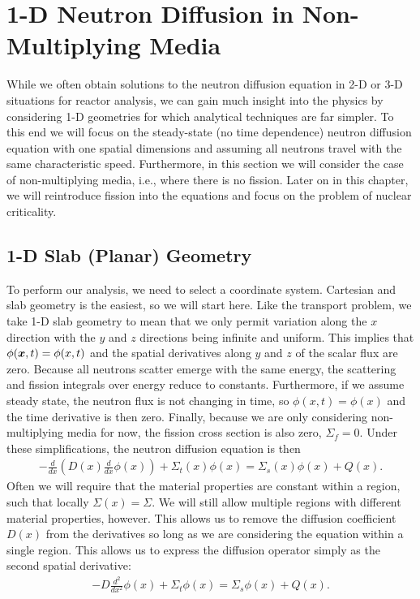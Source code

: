 \section{1-D Neutron Diffusion in Non-Multiplying Media}

While we often obtain solutions to the neutron diffusion equation in 2-D or 3-D situations for reactor analysis, we can gain much insight into the physics by considering 1-D geometries for which analytical techniques are far simpler. To this end we will focus on the steady-state (no time dependence) neutron diffusion equation with one spatial dimensions and assuming all neutrons travel with the same characteristic speed. Furthermore, in this section we will consider the case of non-multiplying media, i.e., where there is no fission. Later on in this chapter, we will reintroduce fission into the equations and focus on the problem of nuclear criticality.

\subsection{1-D Slab (Planar) Geometry}

To perform our analysis, we need to select a coordinate system. Cartesian and slab geometry is the easiest, so we will start here. Like the transport problem, we take 1-D slab geometry to mean that we only permit variation along the $x$ direction with the $y$ and $z$ directions being infinite and uniform. This implies that $\phi(\bm{x},t) = \phi(x,t)$ and the spatial derivatives along $y$ and $z$ of the scalar flux are zero. Because all neutrons scatter emerge with the same energy, the scattering and fission integrals over energy reduce to constants. Furthermore, if we assume steady state, the neutron flux is not changing in time, so $\phi(x,t) = \phi(x)$ and the time derivative is then zero. Finally, because we are only considering non-multiplying media for now, the fission cross section is also zero, $\Sigma_f = 0$. Under these simplifications, the neutron diffusion equation is then
\begin{align}
  - \frac{d}{dx} \left(  D(x) \frac{d}{dx} \phi(x) \right) + \Sigma_t(x) \phi(x) = \Sigma_s(x) \phi(x) + Q(x).
\end{align}
Often we will require that the material properties are constant within a region, such that locally $\Sigma(x) = \Sigma$. We will still allow multiple regions with different material properties, however. This allows us to remove the diffusion coefficient $D(x)$ from the derivatives so long as we are considering the equation within a single region. This allows us to express the diffusion operator simply as the second spatial derivative:
\begin{align}
  - D \frac{d^2}{dx^2} \phi(x) + \Sigma_t \phi(x) = \Sigma_s \phi(x) + Q(x).
\end{align}

